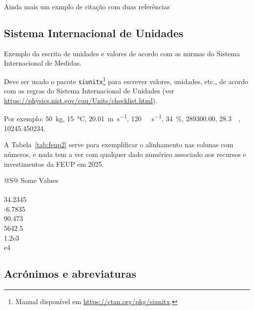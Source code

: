 Ainda mais um exmplo de citação com duas referências~\parencite{iso_19156_2011,ornelas2016} 
\lipsum[5]

\subsection*{Sistema Internacional de Unidades} \label{sec:siu}

\begin{info}
Exemplo da escrita de unidades e valores de acordo com as normas do Sistema Internacional de Medidas.
\end{info}

Deve ser usado o pacote \texttt{siunitx}\footnote{Manual disponível em 
\url{https://ctan.org/pkg/siunitx}.} para escrever valores, unidades, etc., 
de acordo com as regras do Sistema Internacional de Unidades 
(ver \url{https://physics.nist.gov/cuu/Units/checklist.html}). 

Por exemplo:
\SI{50}{\kilo\gram}, 
\SI{15}{\celsius}, 
\SI{20,01}{\meter\per\second}, 
\SI{120}{\kilo\byte\per\second}, 
\SI{34}{\percent}, 
\SI{289300.00}{\eurocurrency}, 
\SI{28.3}{\mega\eurocurrency}, 
\num{10245.450234}.

A Tabela~\ref{tab:feup2} %
serve para exemplificar o alinhamento nas colunas com números, e nada tem a ver com qualquer dado numérico associado aos recursos e investimentos da \acs*{FEUP} em 2025.

\begin{table}
  \centering
  \caption{A table, caption on top.}
  \begin{tabular}{@{}S@{}}
    \toprule
    {Some Values} \\
     \\
    34.2345 \\
    -6.7835 \\
    90.473 \\
    5642.5 \\
    1.2e3 \\
    e4 \\
    \bottomrule
  \end{tabular}
  \label{tab:feup2}
\end{table}

\lipsum[6]

\subsection*{Acrónimos e abreviaturas} \label{sec:acronym}


